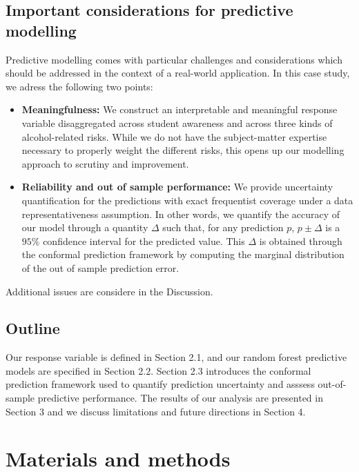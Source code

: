 \documentclass[10pt]{amsart}%
\begin{document}
\subsection{Important considerations for predictive modelling}

Predictive modelling comes with particular challenges and considerations which should be addressed in the context of a real-world application. In this case study, we adress the following two points:

\begin{itemize}
\item \textbf{Meaningfulness:} We construct an interpretable and meaningful response variable disaggregated across student awareness and across three kinds of alcohol-related risks. While we do not have the subject-matter expertise necessary to properly weight the different risks, this opens up our modelling approach to scrutiny and improvement.
\item \textbf{Reliability and out of sample performance:} We provide uncertainty quantification for the predictions with exact frequentist coverage under a data representativeness assumption. In other words, we quantify the accuracy of our model through a quantity $\Delta$ such that, for any prediction $p$, $p \pm \Delta$ is a $95\%$ confidence interval for the predicted value. This $\Delta$ is obtained through the conformal prediction framework by computing the marginal distribution of the out of sample prediction error. 
\end{itemize}

Additional issues are considere in the Discussion.

\subsection{Outline}

Our response variable is defined in Section 2.1, and our random forest predictive models are specified in Section 2.2. Section 2.3 introduces the conformal prediction framework used to quantify prediction uncertainty and asssess out-of-sample predictive performance. The results of our analysis are presented in Section 3 and we discuss limitations and future directions in Section 4.



\section{Materials and methods}
\end{document}
